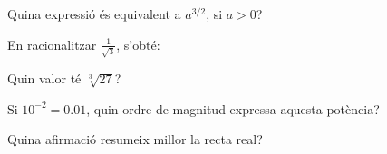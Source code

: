 \begin{enumerate}
\pregunta Quina expressió és equivalent a $a^{3/2}$, si $a>0$?
\begin{enumerate}
\end{enumerate}
\feedback


\pregunta En racionalitzar $\frac{1}{\sqrt{3}}$, s’obté:
\begin{enumerate}
\end{enumerate}
\feedback


\pregunta Quin valor té $\sqrt[3]{27}$?
\begin{enumerate}
\end{enumerate}
\feedback


\pregunta Si $10^{-2}=0.01$, quin ordre de magnitud expressa aquesta potència?
\begin{enumerate}
\end{enumerate}
\feedback


\pregunta Quina afirmació resumeix millor la recta real?
\begin{enumerate}
\end{enumerate}
\feedback

\end{enumerate}